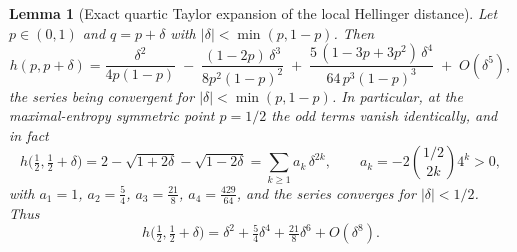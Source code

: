 \documentclass[11pt,reqno]{amsart}
\theoremstyle{plain}
\newtheorem{lemma}[theorem]{Lemma}
\theoremstyle{definition}
\theoremstyle{remark}
\numberwithin{equation}{section}
\begin{document}
\begin{lemma}[Exact quartic Taylor expansion of the local Hellinger distance]\label{lem:taylor}
Let $p\in(0,1)$ and $q=p+\delta$ with $|\delta|<\min(p,1-p)$. Then
\begin{equation}\label{eq:taylor}
h(p,p+\delta)=\frac{\delta^2}{4p(1-p)}\;-\;\frac{(1-2p)\,\delta^3}{8p^2(1-p)^2}\;+\;\frac{5\,(1-3p+3p^2)\,\delta^4}{64\,p^3(1-p)^3}\;+\;O(\delta^5),
\end{equation}
the series being convergent for $|\delta|<\min(p,1-p)$. In particular, at the maximal-entropy symmetric point $p=1/2$ the odd terms vanish identically, and in fact
\begin{equation}\label{eq:half}
h\bigl(\tfrac12,\tfrac12+\delta\bigr)=2-\sqrt{1+2\delta}-\sqrt{1-2\delta}=\sum_{k\ge1}a_k\,\delta^{2k},\qquad a_k=-2\binom{1/2}{2k}4^k>0,
\end{equation}
with $a_1=1$, $a_2=\tfrac54$, $a_3=\tfrac{21}{8}$, $a_4=\tfrac{429}{64}$, and the series converges for $|\delta|<1/2$. Thus
\begin{equation}\label{eq:half4}
h\bigl(\tfrac12,\tfrac12+\delta\bigr)=\delta^2+\tfrac54\delta^4+\tfrac{21}{8}\delta^6+O(\delta^8).
\end{equation}
\end{lemma}
\end{document}

